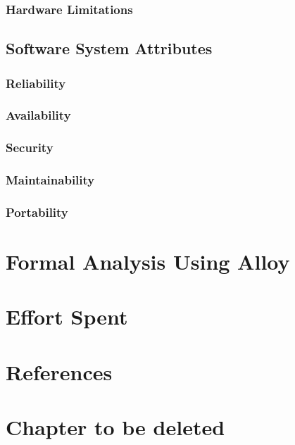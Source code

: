 \documentclass{Configuration_Files/PoliMi3i_thesis}
\begin{document}
\subsection{Hardware Limitations}

\section{Software System Attributes}

\subsection{Reliability}

\subsection{Availability}

\subsection{Security}

\subsection{Maintainability}

\subsection{Portability}

\chapter{Formal Analysis Using Alloy}

\chapter{Effort Spent}

\chapter{References}

\chapter{Chapter to be deleted}
\label{ch:chapter_one}%
\end{document}

